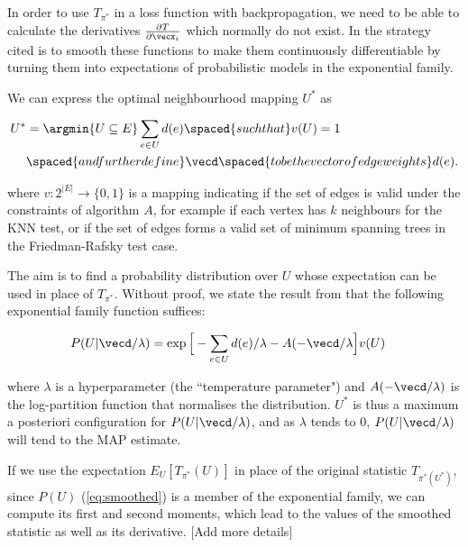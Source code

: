 In order to use $T_{\pi^*}$ in a loss function with backpropagation, we need to be able to calculate the derivatives $\frac{\partial T}{\partial \vecx_i}$ which normally do not exist. In \cite{torchtwosample} the strategy cited is to smooth these functions to make them continuously differentiable by turning them into expectations of probabilistic models in the exponential family. 


We can express the optimal neighbourhood mapping $U^*$ as 

\begin{equation}
\begin{split}
U^* &= \argmin{U \subseteq E} \sum_{e \in U} d(e) \spaced{such that} v(U) = 1 \\
&\spaced{and further define} \vecd \spaced{to be the vector of edge weights} d(e). 
\end{split}
\end{equation}

where $v: 2^{|E|} \rightarrow \{0, 1 \}$ is a mapping indicating if the set of edges is valid under the constraints of algorithm $A$, for example if each vertex has $k$ neighbours for the KNN test, or if the set of edges forms a valid set of minimum spanning trees in the Friedman-Rafsky test case. 

The aim is to find a probability distribution over $U$ whose expectation can be used in place of $T_{\pi^*}$. Without proof, we state the result from \cite{torchtwosample} that the following exponential family function suffices:

\begin{equation}
\label{eq:smoothed}
\begin{split}
P(U | \vecd / \lambda) &= \exp\Big[-\sum_{e \in U} d(e) / \lambda - A(-\vecd / \lambda \Big] v(U)
\end{split}
\end{equation}

where $\lambda$ is a hyperparameter (the ``temperature parameter") and $A(-\vecd / \lambda)$ is the log-partition function  that normalises the distribution. $U^*$ is thus a maximum a posteriori configuration for $P(U | \vecd/\lambda)$, and as $\lambda$ tends to 0,  $P(U | \vecd/\lambda)$ will tend to the MAP estimate. 

If we use the expectation $E_{U}[T_{\pi^*}(U)]$ in place of the original statistic $T_{\pi^*(U^*)}$, since $P(U)$ (\ref{eq:smoothed}) is a member of the exponential family, we can compute its first and second moments, which lead to the values of the smoothed statistic as well as its derivative.  [Add more details]

